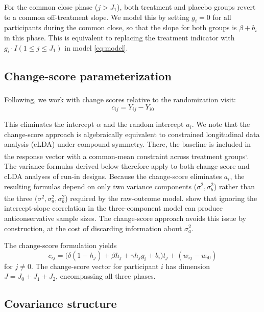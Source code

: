 \documentclass[
  11pt,
]{article}
\begin{document}
For the common close phase (\(j > J_1\)), both treatment and
placebo groups revert to a common off-treatment slope. We
model this by setting \(g_i = 0\) for all participants during
the common close, so that the slope for both groups is \(\beta
+ b_i\) in this phase. This is equivalent to replacing the
treatment indicator with \(g_i \cdot I(1 \le j \le J_1)\) in
model \eqref{eq:model}.

\subsection{Change-score parameterization}\label{change-score-parameterization}

Following\textsuperscript{}, we work with
change scores relative to the randomization visit:
\begin{equation}
  c_{ij} = Y_{ij} - Y_{i0}
  \label{eq:change}
\end{equation}

This eliminates the intercept \(\alpha\) and the random
intercept \(a_i\). We note that the change-score approach
is algebraically equivalent to constrained longitudinal
data analysis (cLDA) under compound symmetry. There, the
baseline is included in the response vector with a
common-mean constraint across treatment groups\textsuperscript{,}.
The variance formulas derived below therefore apply
to both change-score and cLDA analyses of run-in
designs. Because the change-score eliminates \(a_i\),
the resulting formulas depend on only two variance
components (\(\sigma^2, \sigma_b^2\)) rather than the
three (\(\sigma^2, \sigma_a^2, \sigma_b^2\)) required
by the raw-outcome model.\textsuperscript{} show that
ignoring the intercept-slope correlation in the
three-component model can produce anticonservative
sample sizes. The change-score approach avoids this
issue by construction, at the cost of discarding
information about \(\sigma_a^2\).

The change-score formulation yields
\begin{equation}
  c_{ij} = \bigl(\delta(1-h_j) + \beta h_j
    + \gamma h_j g_i + b_i\bigr) t_j
    + (w_{ij} - w_{i0})
  \label{eq:change_model}
\end{equation}
for \(j \ne 0\). The change-score vector for participant \(i\)
has dimension \(J = J_0 + J_1 + J_2\), encompassing all three phases.

\subsection{Covariance structure}\label{covariance-structure}
\end{document}
